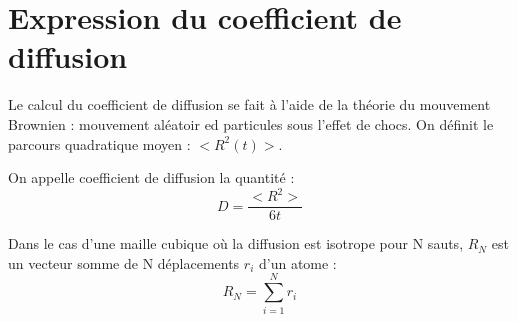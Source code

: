 \section{Expression du coefficient de diffusion}

Le calcul du coefficient de diffusion se fait à l'aide de la théorie du mouvement Brownien : mouvement aléatoir ed particules sous l'effet de chocs. On définit le parcours quadratique moyen : $<R^2(t)>$.

On appelle coefficient de diffusion la quantité :
\begin{equation}
D = \frac{<R^2>}{6t}
\end{equation}

Dans le cas d'une maille cubique où la diffusion est isotrope pour N sauts, $R_N$ est un vecteur somme de N déplacements $r_i$ d'un atome :
\begin{equation}
R_N = \sum_{i=1}^N r_i
\end{equation}

